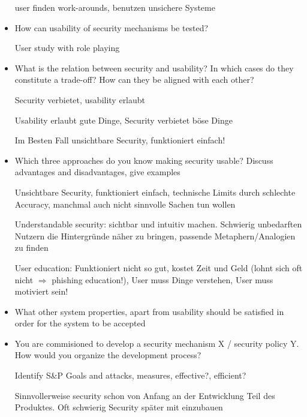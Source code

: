\begin{itemize}
		user finden work-arounds, benutzen unsichere Systeme
	\item
		How can usability of security mechanisms be tested?
		
		User study with role playing
	\item
		What is the relation between security and usability? In which cases do they constitute a trade-off? How can they be aligned with each other?

		Security verbietet, usability erlaubt

	  Usability erlaubt gute Dinge, Security verbietet böse Dinge

		Im Besten Fall unsichtbare Security, funktioniert einfach!
	\item
		Which three approaches do you know making security usable? Discuss advantages and disadvantages, give examples

		Unsichtbare Security, funktioniert einfach, technische Limits durch schlechte Accuracy, manchmal auch nicht sinnvolle Sachen tun wollen

		Understandable security: sichtbar und intuitiv machen. Schwierig unbedarften Nutzern die Hintergründe näher zu bringen, passende Metaphern/Analogien zu finden

		User education: Funktioniert nicht so gut, kostet Zeit und Geld (lohnt sich oft nicht $\Rightarrow$ phishing education!), User muss Dinge verstehen,  User muss motiviert sein!
	\item
		What other system properties, apart from usability should be satisfied in order for the system to be accepted
	\item
		You are commisioned to develop a security mechanism X / security policy Y. How would you organize the development process?

		Identify S\&P Goals and attacks, measures, effective?, efficient?

		Sinnvollerweise security schon von Anfang an der Entwicklung Teil des Produktes. Oft schwierig Security später mit einzubauen
\end{itemize}

